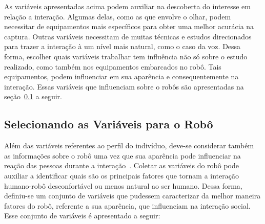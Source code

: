 As variáveis apresentadas acima podem auxiliar na descoberta do interesse em relação a interação. Algumas delas, como as que envolve o olhar, podem necessitar de equipamentos mais específicos para obter uma melhor acurácia na captura. Outras variáveis necessitam de muitas técnicas e estudos direcionados para trazer a interação à um nível mais natural, como o caso da voz. Dessa forma, escolher quais variáveis trabalhar tem influência não só sobre o estudo realizado, como também nos equipamentos embarcados no robô. Tais equipamentos, podem influenciar em sua aparência e consequentemente na interação. Essas variáveis que influenciam sobre o robôs são apresentadas na seção~\ref{sec:variaveisrobo} a seguir.

\subsection{Selecionando as Variáveis para o Robô}
\label{sec:variaveisrobo}
Além das variáveis referentes ao perfil do indivíduo, deve-se considerar também as informações sobre o robô uma vez que sua aparência pode influenciar na reação das pessoas durante a interação~\cite{hegel:2009}. Coletar as variáveis do robô pode auxiliar a identificar quais são os principais fatores que tornam a interação humano-robô desconfortável ou menos natural ao ser humano. Dessa forma, definiu-se um conjunto de variáveis que pudessem caracterizar da melhor maneira fatores do robô, referente a sua aparência, que influenciam na interação social. Esse conjunto de variáveis é apresentado a seguir:

